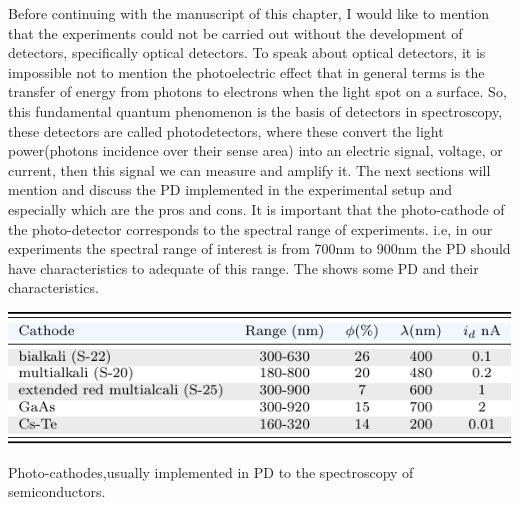 Before continuing with the manuscript of this chapter, I would like to mention that the experiments could not be carried out without the development of detectors, specifically optical detectors. To speak about optical detectors, it is impossible not to mention the photoelectric effect that in general terms is the transfer of energy from photons to electrons when the light spot on a surface\cite{einstein1905uber}. So, this fundamental quantum phenomenon is the basis of detectors in spectroscopy, these detectors are called photodetectors, where these convert the light power(photons incidence over their sense area)  into an electric signal, voltage, or current, then this signal we can measure and amplify it. The next sections will mention and discuss the PD implemented in the experimental setup and especially which are the pros and cons. It is important that the photo-cathode of the photo-detector corresponds to the spectral range of experiments. i.e, in our experiments the spectral range of interest is from 700nm to 900nm the PD should have characteristics to adequate of this range. The  shows some PD and their characteristics\cite{tkachenko2006opticalspectroscopy}. 
\begin{table}
	\centering
	\includegraphics[width=\textwidth]{../tables/chapter-3/table-photodetectors/out/photodetectors.pdf}
	\caption{Photo-cathodes,usually implemented in PD to the spectroscopy of semiconductors\cite{tkachenko2006opticalspectroscopy}. }
	\label{tab:chapter-3-section-samples-photodectors-materials}
\end{table}



